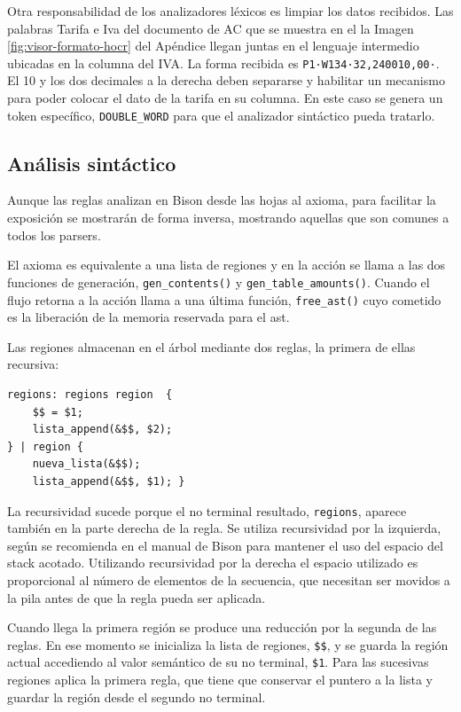 Otra responsabilidad de los analizadores léxicos es limpiar los datos recibidos. Las palabras Tarifa e Iva del documento de AC que se muestra en el la Imagen \ref{fig:visor-formato-hocr} del Apéndice llegan juntas en el lenguaje intermedio ubicadas en la columna del IVA. La forma recibida es \verb|P1·W134·32,240010,00·|. El 10 y los dos decimales a la derecha deben separarse y habilitar un mecanismo para poder colocar el dato de la tarifa en su columna. En este caso se genera un token específico, \verb|DOUBLE_WORD| para que el analizador sintáctico pueda tratarlo.

\subsection{Análisis sintáctico}

Aunque las reglas analizan en Bison desde las hojas al axioma, para facilitar la exposición se mostrarán de forma inversa, mostrando aquellas que son comunes a todos los parsers.

El axioma es equivalente a una lista de regiones y en la acción se llama a las dos funciones de generación, \verb|gen_contents()| y \verb|gen_table_amounts()|. Cuando el flujo retorna a la acción llama a una última función, \verb|free_ast()| cuyo cometido es la liberación de la memoria reservada para el \acrshort{ast}.

Las regiones almacenan en el árbol mediante dos reglas, la primera de ellas recursiva:

\begin{lstlisting}[caption={},label={}]
regions: regions region  {
    $$ = $1;
    lista_append(&$$, $2);
} | region {
    nueva_lista(&$$);
    lista_append(&$$, $1); }
\end{lstlisting}

La recursividad sucede porque el no terminal resultado, \verb|regions|, aparece también en la parte derecha de la regla. Se utiliza recursividad por la izquierda, según se recomienda en el manual de Bison para mantener el uso del espacio del stack acotado. Utilizando recursividad por la derecha el espacio utilizado es proporcional al número de elementos de la secuencia, que necesitan ser movidos a la pila antes de que la regla pueda ser aplicada.

Cuando llega la primera región se produce una reducción por la segunda de las reglas. En ese momento se inicializa la lista de regiones, \verb|$$|, y se  guarda la región actual accediendo al valor semántico de su no terminal, \verb|$1|. Para las sucesivas regiones aplica la primera regla, que tiene que conservar el puntero a la lista y guardar la región desde el segundo no terminal.


